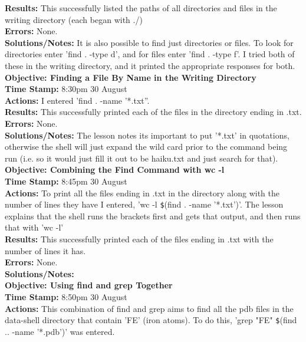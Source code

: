 \documentclass{article}
\begin{document}
\begin{FlushLeft}
\textbf{Results:} This successfully listed the paths of all directories and files in the writing directory (each began with ./) \\
\textbf{Errors:} None. \\
\textbf{Solutions/Notes:} It is also possible to find just directories or files. To look for directories enter 'find . -type d', and for files enter 'find . -type f'. I tried both of these in the writing directory, and it printed the appropriate responses for both. \\
\vspace{5mm}
\textbf{Objective: Finding a File By Name in the Writing Directory}\\ 
\textbf{Time Stamp:} 8:30pm 30 August\\
\textbf{Actions:} I entered 'find . -name '*.txt''.\\
\textbf{Results:} This successfully printed each of the files in the directory ending in .txt.\\
\textbf{Errors:} None. \\
\textbf{Solutions/Notes:} The lesson notes its important to put '*.txt' in quotations, otherwise the shell will just expand the wild card prior to the command being run (i.e. so it would just fill it out to be haiku.txt and just search for that).\\
\vspace{5mm}
\textbf{Objective: Combining the Find Command with wc -l}\\ 
\textbf{Time Stamp:} 8:45pm 30 August\\
\textbf{Actions:} To print all the files ending in .txt in the directory along with the number of lines they have I entered, 'wc -l \verb|$|(find . -name '*.txt')'. The lesson explains that the shell runs the brackets first and gets that output, and then runs that with 'wc -l' \\
\textbf{Results:} This successfully printed each of the files ending in .txt with the number of lines it has. \\
\textbf{Errors:} None.\\
\textbf{Solutions/Notes:}\\
\vspace{5mm}
\textbf{Objective: Using find and grep Together}\\ 
\textbf{Time Stamp:} 8:50pm 30 August\\
\textbf{Actions:} This combination of find and grep aims to find all the pdb files in the data-shell directory that contain 'FE' (iron atoms). To do this, 'grep "FE" \verb|$|(find .. -name '*.pdb')' was entered.\\

\end{FlushLeft}
\end{document}
